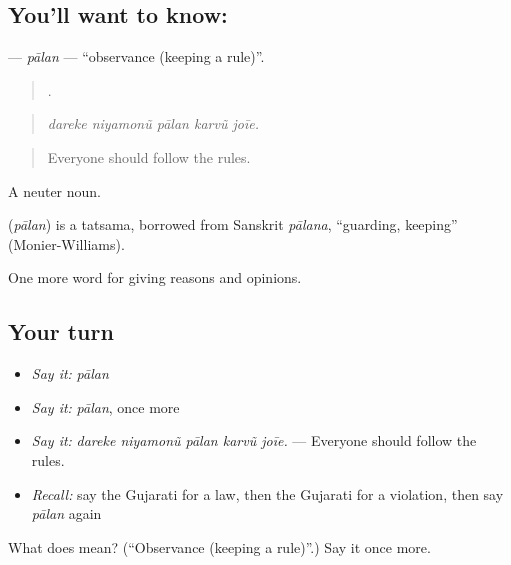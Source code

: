 \subsection*{You'll want to know: }
\textbf{} — \emph{pālan} — \textquotedblleft{}observance (keeping a rule)\textquotedblright{}.

\begin{quote}
    .
\end{quote}

\begin{quote}
\emph{dareke niyamonũ pālan karvũ joīe.}
\end{quote}

\begin{quote}
Everyone should follow the rules.
\end{quote}

A neuter noun.

\begin{cousinweb}
\textbf{} (\emph{pālan}) is a tatsama, borrowed from Sanskrit \emph{pālana}, \textquotedblleft{}guarding, keeping\textquotedblright{} (Monier-Williams).
\end{cousinweb}

\begin{grammarlens}[title={What you've built}]
One more word for giving reasons and opinions.
\end{grammarlens}

\subsection*{Your turn}
\begin{itemize}
\raggedright
  \item \emph{Say it:} \emph{pālan}
  \item \emph{Say it:} \emph{pālan}, once more
  \item \emph{Say it:} \emph{dareke niyamonũ pālan karvũ joīe.} — Everyone should follow the rules.
  \item \emph{Recall:} say the Gujarati for a law, then the Gujarati for a violation, then say \emph{pālan} again
\end{itemize}

\begin{tcolorbox}[breakable,colback=teal!4,colframe=teal!35!black,title={Before you move on}]
What does  mean? (\textquotedblleft{}Observance (keeping a rule)\textquotedblright{}.) Say it once more.
\end{tcolorbox}
